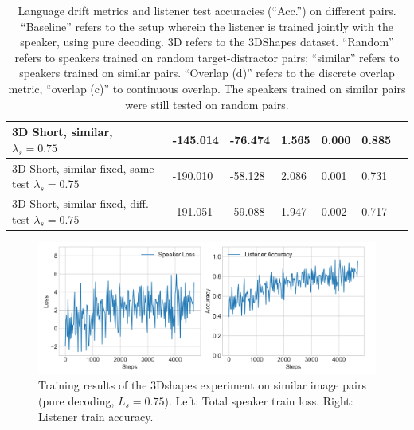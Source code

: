 \begin{table}[]
\begin{tabularx}{\textwidth}{|X|l|l|X|X|X|X|}
		3D Short, similar, $\lambda_s = 0.75$&      -145.014             &      -76.474                  &             1.565         &         0.000             &                   0.885                       &                                           \\ \hline
		3D Short, similar fixed, same test $\lambda_s = 0.75$&      -190.010           &     -58.128                  &             2.086         &         0.001             &                   0.731                       &                                           \\ \hline
		3D Short, similar fixed, diff. test $\lambda_s = 0.75$&     -191.051        &        -59.088           &   1.947        &        0.002          &        0.717                               &                                           \\ \hline
	\end{tabularx}
	\caption{\label{tab:3dshapes_drift_metrics_basic_similar} Language drift metrics and listener test accuracies (``Acc.'') on different pairs. 
		``Baseline'' refers to the setup wherein the listener is trained jointly with the speaker, using pure decoding. 3D refers to the 3DShapes dataset. ``Random'' refers to speakers trained on random target-distractor pairs; ``similar'' refers to speakers trained on similar pairs. ``Overlap (d)'' refers to the discrete overlap metric, ``overlap (c)'' to continuous overlap. The speakers trained on similar pairs were still tested on random pairs.}
\end{table}

\begin{figure}[h]
	\centering
	\includegraphics[width=\linewidth]{images/3dshapes_refgame_49_pure_075_similar.png}
	\caption{Training results of the 3Dshapes experiment on similar image pairs (pure decoding, $L_s = 0.75$). Left: Total speaker train loss. Right: Listener train accuracy.}
	\label{fig:3dshapes_similar_075_speaker_loss_listener_acc}
\end{figure}

